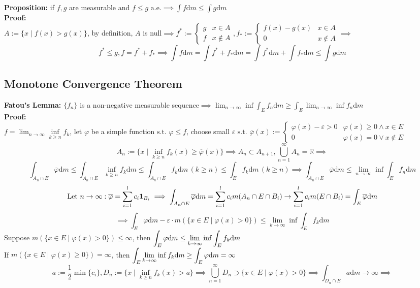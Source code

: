 \documentclass{article}
\newcommand{\R}{\mathbb{R}}
\newcommand{\cupninf}{\displaystyle\bigcup_{n=1}^\infty}
\newcommand{\limninf}{\displaystyle\lim_{n\to\infty}}
\newcommand{\limkinf}{\displaystyle\lim_{k\to\infty}}
\newcommand{\st}{\mbox{ s.t. }}
\newcommand{\0}{{\bf{0}}}
\newcommand{\1}{{\bf{1}}}
\newcommand{\alev}{\mbox{ a.e.}}
\newcommand{\dint}{\displaystyle\int}
\newcommand{\dif}{\mbox{d}}
\begin{document}
\textbf{Proposition:} if $f,g$ are measurable and $f\le g\alev\implies\dint f\dif m\le\int g\dif m$\\
\textbf{Proof:}\\
$A:=\{x\mid f(x)>g(x)\}$, by definition, $A$ is null$\implies f^*:=\begin{cases}
    g&x\in A\\
    f&x\notin A
\end{cases},f_*:=\begin{cases}
    f(x)-g(x)&x\in A\\
    0&x\notin A
\end{cases}\implies$
$$f^*\le g,f=f^*+f_*\implies\int f\dif m=\int f^*+f_*\dif m=\int f^*\dif m+\int f_*\dif m\le\int g\dif m$$
\subsection{Monotone Convergence Theorem}
\textbf{Fatou's Lemma:} $\{f_n\}$ is a non-negative measurable sequence$\implies\limninf\displaystyle\inf\int_Ef_n\dif m\geq\dint_E\limninf\inf f_n\dif m$\\
\textbf{Proof:}\\
$f=\limninf\inf\limits_{k\geq n}f_k$, let $\varphi$ be a simple function$\st\varphi\le f$, choose small $\varepsilon\st\overline{\varphi}(x):=\begin{cases}
    \varphi(x)-\varepsilon>0&\varphi(x)\geq0\land x\in E\\
    0&\varphi(x)=0\lor x\notin E
\end{cases}$
$$A_n:=\{x\mid\inf_{k\geq n}f_k(x)\geq\overline{\varphi}(x)\}\implies A_n\subset A_{n+1},\cupninf A_n=\R\implies$$
$$\int_{A_n\cap E}\overline\varphi \dif m\le\int_{A_n\cap E}\inf_{k\geq n}f_k\dif m\le\int_{A_n\cap E}f_k\dif m\,(k\geq n)\le\int_Ef_k\dif m\,(k\geq n)\implies\int_{A_n\cap E}\overline\varphi \dif m\le\limninf\inf\int_E f_n\dif m$$
$$\mbox{Let }n\to\infty:\overline\varphi=\sum_{i=1}^lc_i\1_{B_i}\implies\int_{A_n\cap E}\overline\varphi \dif m=\sum_{i=1}^l c_im(A_n\cap E\cap B_i)\to\sum_{i=1}^lc_im(E\cap B_i)=\int_E\overline\varphi \dif m$$
$$\implies\int_E\varphi \dif m-\varepsilon\cdot m(\{x\in E\mid\varphi(x)>0\})\le\limkinf\inf\int_Ef_k\dif m$$
Suppose $m(\{x\in E\mid\varphi(x)>0\})\le\infty$, then $\dint_E\varphi \dif m\le\displaystyle\limkinf\inf\dint_Ef_k\dif m$\\
If $m(\{x\in E\mid\varphi(x)\geq0\})=\infty$, then $\dint_E \displaystyle\limkinf\inf f_k\dif m\geq\dint_E\varphi \dif m=\infty$
$$a:=\frac{1}{2}\min\{c_i\},D_n:=\{x\mid\inf_{k\geq n}f_k(x)>a\}\implies\cupninf D_n\supset\{x\in E\mid\varphi(x)>0\}\implies\int_{D_n\cap E}a\dif m\to\infty\implies$$
\end{document}
